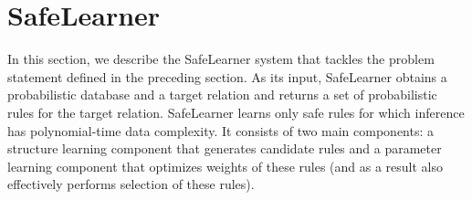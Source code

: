 \documentclass[akbc,twoside,11pt]{article}
\newcounter{example}
\newcommand{\algorithmname}{SafeLearner\xspace}
\begin{document}

\section{\algorithmname}
\label{sec:openprobfoil}
In this section, we describe the \algorithmname system that tackles the problem statement defined in the preceding section. As its input, \algorithmname obtains a probabilistic database and a target relation and returns a set of probabilistic rules for the target relation. \algorithmname learns only safe rules for which inference has polynomial-time data complexity. It consists of two main components: a structure learning component that generates candidate rules and a parameter learning component that optimizes weights of these rules (and as a result also effectively performs selection of these rules). 
\end{document}
